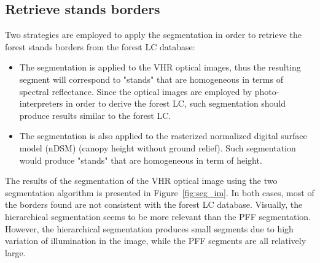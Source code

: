 \subsection{Retrieve stands borders}

Two strategies are employed to apply the segmentation in order to retrieve the forest stands borders from the forest LC database:
\begin{itemize}
\item The segmentation is applied to the VHR optical images, thus the resulting segment will correspond to "stands" that are homogeneous in terms of spectral reflectance. Since the optical images are employed by photo-interpreters in order to derive the forest LC, such segmentation should produce results similar to the forest LC.
\item The segmentation is also applied to the rasterized normalized digital surface model (nDSM) (canopy height without ground relief). Such segmentation would produce "stands" that are homogeneous in term of height.
\end{itemize}

The results of the segmentation of the VHR optical image using the two segmentation algorithm is presented in Figure~\ref{fig:seg_im}. In both cases, most of the borders found are not consistent with the forest LC database. Visually, the hierarchical segmentation seems to be more relevant than the PFF segmentation. However, the hierarchical segmentation produces small segments due to high variation of illumination in the image, while the PFF segments are all relatively large. 

